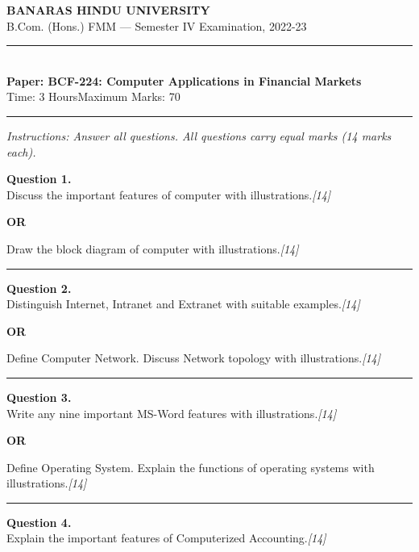 \documentclass[11pt,a4paper]{article}
\newcommand{\pts}[1]{\hfill   \textit{[#1]}}
\begin{document}
\begin{center}
  {\large\bfseries BANARAS HINDU UNIVERSITY}\\[2pt]
  {\normalsize B.Com. (Hons.) FMM --- Semester IV Examination, 2022-23}\\[6pt]
  \rule{0.8\linewidth}{0.5pt}\\[6pt]
  {\large\bfseries Paper: BCF-224: Computer Applications in Financial Markets}\\[4pt]
  {\normalsize Time: 3 Hours\hfill Maximum Marks: 70}
\end{center}

\rule{\linewidth}{0.4pt}

\smallskip



\noindent   \textit{Instructions: Answer all questions. All questions carry equal marks (14 marks each).}

\bigskip




\noindent   \textbf{Question 1.} \\
Discuss the important features of computer with illustrations.\pts{14}

\centerline{   \textbf{OR}}

Draw the block diagram of computer with illustrations.\pts{14}

\medskip\rule{\linewidth}{0.2pt}




\noindent   \textbf{Question 2.} \\
Distinguish Internet, Intranet and Extranet with suitable examples.\pts{14}

\centerline{   \textbf{OR}}

Define Computer Network. Discuss Network topology with illustrations.\pts{14}

\medskip\rule{\linewidth}{0.2pt}




\noindent   \textbf{Question 3.} \\
Write any nine important MS-Word features with illustrations.\pts{14}

\centerline{   \textbf{OR}}

Define Operating System. Explain the functions of operating systems with illustrations.\pts{14}

\medskip\rule{\linewidth}{0.2pt}




\noindent   \textbf{Question 4.} \\
Explain the important features of Computerized Accounting.\pts{14}
\end{document}
